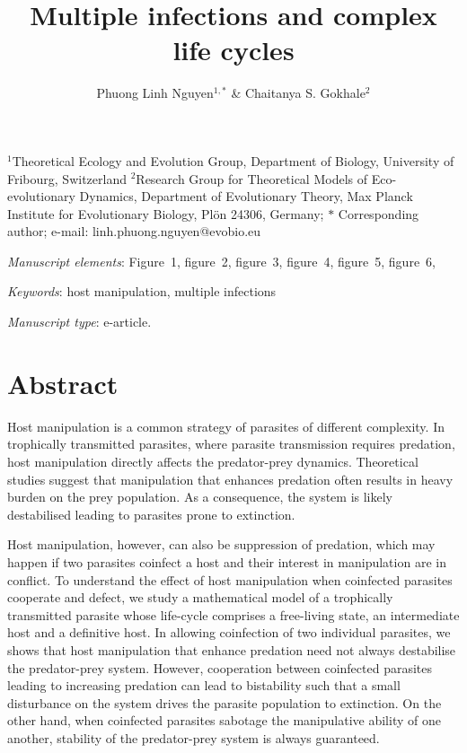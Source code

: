 \documentclass[11pt]{article}
\title{Multiple infections and complex life cycles}
\author{Phuong Linh Nguyen$^{1,\ast}$ \& 
Chaitanya S. Gokhale$^{2}$
}
\date{}
\begin{document}
\maketitle

%
\noindent{} $^1$Theoretical Ecology and Evolution Group, Department of Biology, University of Fribourg, Switzerland
\noindent{} $^2$Research Group for Theoretical Models of Eco-evolutionary Dynamics, Department of Evolutionary Theory, Max Planck Institute for Evolutionary Biology, Pl\"{o}n 24306, Germany;
%
\noindent{} $\ast$ Corresponding author; e-mail: linh.phuong.nguyen@evobio.eu

\bigskip

\textit{Manuscript elements}:  Figure~1, figure~2, figure~3, figure~4, figure~5, figure~6, %

\bigskip

\textit{Keywords}: host manipulation, multiple infections


\bigskip

\textit{Manuscript type}: e-article. %

\bigskip



\newpage{}

\section*{Abstract}
Host manipulation is a common strategy of parasites of different complexity. In trophically transmitted parasites, where parasite transmission requires predation, host manipulation directly affects the predator-prey dynamics. Theoretical studies suggest that manipulation that enhances predation often results in heavy burden on the prey population. As a consequence, the system is likely destabilised leading to parasites prone to extinction. 

Host manipulation, however, can also be suppression of predation, which may happen if two parasites coinfect a host and their interest in manipulation are in conflict. To understand the effect of host manipulation when coinfected parasites cooperate and defect, we study a mathematical model of a trophically transmitted parasite whose life-cycle comprises a free-living state, an intermediate host and a definitive host. In allowing coinfection of two individual parasites, we shows that host manipulation that enhance predation need not always destabilise the predator-prey system. However, cooperation between coinfected parasites leading to increasing predation can lead to bistability such that a small disturbance on the system drives the parasite population to extinction. On the other hand, when coinfected parasites sabotage the manipulative ability of one another, stability of the predator-prey system is always guaranteed.
\end{document}
